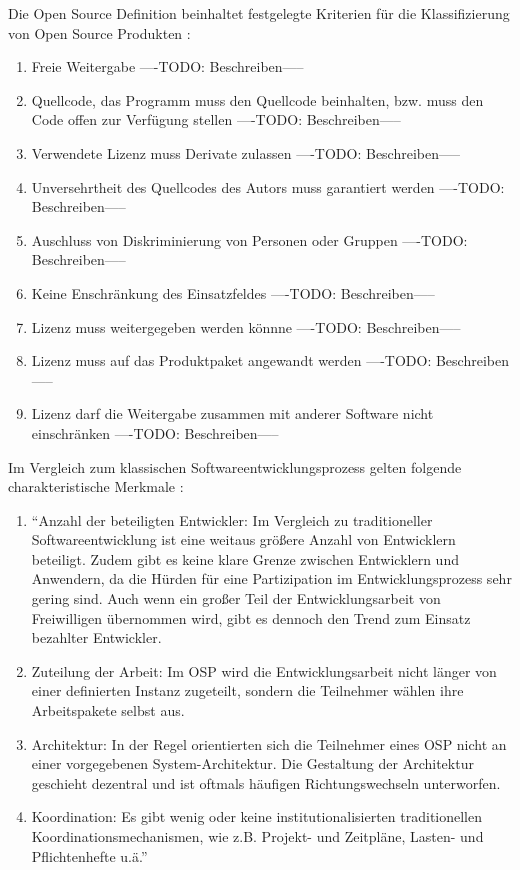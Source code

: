 Die Open Source Definition beinhaltet festgelegte Kriterien für die Klassifizierung von Open Source Produkten \cite{suchen}:
\begin{enumerate}
\item Freie Weitergabe
----TODO: Beschreiben-----
\item Quellcode, das Programm muss den Quellcode beinhalten, bzw. muss den Code offen zur Verfügung stellen
----TODO: Beschreiben-----
\item Verwendete Lizenz muss Derivate zulassen
----TODO: Beschreiben-----
\item Unversehrtheit des Quellcodes des Autors muss garantiert werden
----TODO: Beschreiben-----
\item Auschluss von Diskriminierung von Personen oder Gruppen
----TODO: Beschreiben-----
\item Keine Enschränkung des Einsatzfeldes
----TODO: Beschreiben-----
\item Lizenz muss weitergegeben werden könnne
----TODO: Beschreiben-----
\item Lizenz muss auf das Produktpaket angewandt werden
----TODO: Beschreiben-----
\item Lizenz darf die Weitergabe zusammen mit anderer Software nicht einschränken
----TODO: Beschreiben-----
\end{enumerate}

Im Vergleich zum klassischen Softwareentwicklungsprozess gelten folgende charakteristische Merkmale \cite{suchen}:
\begin{enumerate}
\item “Anzahl der beteiligten Entwickler: Im Vergleich zu traditioneller Softwareentwicklung ist eine weitaus größere Anzahl von Entwicklern beteiligt. Zudem gibt es keine klare Grenze zwischen Entwicklern und Anwendern, da die Hürden für eine Partizipation im Entwicklungsprozess sehr gering sind. Auch wenn ein großer Teil der Entwicklungsarbeit von Freiwilligen übernommen wird, gibt es dennoch den Trend zum Einsatz bezahlter Entwickler.
\item Zuteilung der Arbeit: Im OSP wird die Entwicklungsarbeit nicht länger von einer definierten Instanz zugeteilt, sondern die Teilnehmer wählen ihre Arbeitspakete selbst aus.
\item Architektur: In der Regel orientierten sich die Teilnehmer eines OSP nicht an einer vorgegebenen System-Architektur. Die Gestaltung der Architektur geschieht dezentral und ist oftmals häufigen Richtungswechseln unterworfen.
\item Koordination: Es gibt wenig oder keine institutionalisierten traditionellen Koordinationsmechanismen, wie z.B. Projekt- und Zeitpläne, Lasten- und Pflichtenhefte u.ä.” \cite{suchen}
\end{enumerate}

